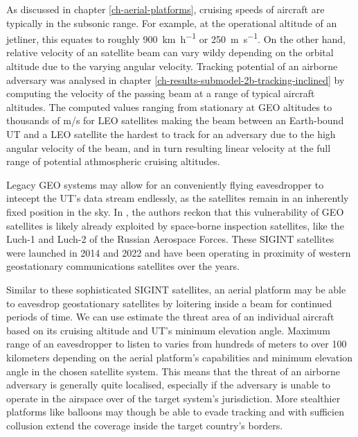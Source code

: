 \documentclass[english, 12pt, a4paper, elec, utf8, a-1b, online]{aaltothesis}
\begin{document}



As discussed in chapter \ref{ch-aerial-platforms}, cruising speeds of aircraft are typically in the subsonic range.
For example, at the operational altitude of an jetliner, this equates to roughly \SI[per-mode=repeated-symbol]{900}{\kilo\meter\per\hour} or \SI[per-mode=repeated-symbol]{250}{\meter\per\second}.
On the other hand, relative velocity of an satellite beam can vary wildy depending on the orbital altitude due to the varying angular velocity.
Tracking potential of an airborne adversary was analysed in chapter \ref{ch-results-submodel-2b-tracking-inclined} by computing the velocity of the passing beam at a range of typical aircraft altitudes.
The computed values ranging from stationary at GEO altitudes to thousands of m/s for LEO satellites making the beam between an Earth-bound UT and a LEO satellite the hardest to track for an adversary due to the high angular velocity of the beam, and in turn resulting linear velocity at the full range of potential athmospheric cruising altitudes.

Legacy GEO systems may allow for an conveniently flying eavesdropper to intecept the UT's data stream endlessly, as the satellites remain in an inherently fixed position in the sky.
In \cite{bingen2023space}, the authors reckon that this vulnerability of GEO satellites is likely already exploited by space-borne inspection satellites, like the Luch-1 and Luch-2 of the Russian Aerospace Forces.
These SIGINT satellites were launched in 2014 and 2022 and have been operating in proximity of western geostationary communications satellites over the years.

Similar to these sophisticated SIGINT satellites, an aerial platform may be able to eavesdrop geostationary satellites by loitering inside a beam for continued periods of time. We can use estimate the threat area of an individual aircraft based on its cruising altitude and UT's minimum elevation angle. Maximum range of an eavesdropper to listen to varies from hundreds of meters to over 100 kilometers depending on the aerial platform's capabilities and minimum elevation angle in the chosen satellite system. This means that the threat of an airborne adversary is generally quite localised, especially if the adversary is unable to operate in the airspace over of the target system's jurisdiction. More stealthier platforms like balloons may though be able to evade tracking and with sufficien collusion extend the coverage inside the target country's borders. %
\end{document}

